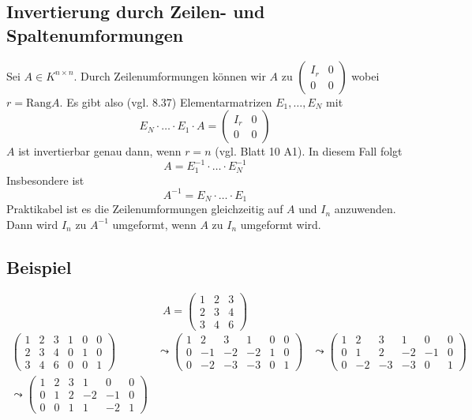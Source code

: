 \subsection{Invertierung durch Zeilen- und Spaltenumformungen} %
\label{sub:invertierung_durch_zeilen_und_spaltenumformungen}
Sei $A \in K^{n \times n}$. Durch Zeilenumformungen können wir $A$ zu $(\begin{smallmatrix}
	I_r & 0 \\
	0 &0
\end{smallmatrix})$ wobei $r = \text{Rang}A$. Es gibt also (vgl. 8.37) Elementarmatrizen $E_1, \ldots , E_N$ mit 
\[
	E_N \cdot  \ldots \cdot E_1 \cdot A = \begin{pmatrix}
		I_r & 0 \\
		0 &0
	\end{pmatrix}
\]
$A$ ist invertierbar genau dann, wenn $r=n$ (vgl. Blatt 10 A1). In diesem Fall folgt
\[
	A = E_1 ^{-1} \cdot \ldots \cdot E_N ^{-1}
\]
Insbesondere ist 
\[
	A ^{-1} = E_N \cdot \ldots \cdot E_1
\]
Praktikabel ist es die Zeilenumformungen gleichzeitig auf $A$ und $I_n$ anzuwenden. Dann wird $I_n$ zu $A ^{-1}$ umgeformt, wenn $A$ zu $I_n$ umgeformt wird.

\subsection{Beispiel} %
\label{sub:beispiel}
\[
	A= \begin{pmatrix}
		1 & 2 & 3 \\
		2 & 3 & 4 \\
		3 & 4 & 6
	\end{pmatrix}
\]
\[
	\begin{array}{ccc}
	\begin{pmatrix}
			1 & 2 & 3 & 1 & 0 & 0 \\
			2 & 3 & 4 & 0 & 1 & 0 \\
			3 & 4 & 6 & 0 & 0 & 1
		\end{pmatrix}
		&\leadsto \begin{pmatrix}
			1 & 2 & 3 & 1 & 0 & 0 \\
			0 & -1 & -2 & -2 & 1 & 0 \\
			0 & -2 & -3 & -3 & 0 & 1
		\end{pmatrix}
		&\leadsto \begin{pmatrix}
			1 & 2 & 3 & 1 & 0 & 0 \\
			0 & 1 & 2 & -2 & -1 & 0 \\
			0 & -2 & -3 & -3 & 0 & 1
		\end{pmatrix} \\
		\leadsto \begin{pmatrix}
					1 & 2 & 3 & 1 & 0 & 0 \\
					0 & 1 & 2 & -2 & -1 & 0 \\
					0 & 0 & 1 & 1 & -2 & 1
				\end{pmatrix}
\end{array}
\]

